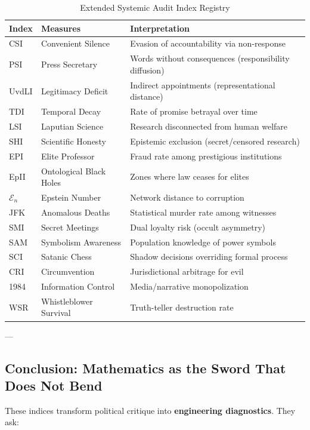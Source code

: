 \documentclass[11pt,a4paper]{article}
\theoremstyle{definition}
\theoremstyle{remark}
\begin{document}
\begin{table}[h]
\centering
\small
\begin{tabular}{|l|l|p{6cm}|}
\hline
\textbf{Index} & \textbf{Measures} & \textbf{Interpretation} \\
\hline
CSI & Convenient Silence & Evasion of accountability via non-response \\
PSI & Press Secretary & Words without consequences (responsibility diffusion) \\
UvdLI & Legitimacy Deficit & Indirect appointments (representational distance) \\
TDI & Temporal Decay & Rate of promise betrayal over time \\
\hline
LSI & Laputian Science & Research disconnected from human welfare \\
SHI & Scientific Honesty & Epistemic exclusion (secret/censored research) \\
EPI & Elite Professor & Fraud rate among prestigious institutions \\
\hline
EpII & Ontological Black Holes & Zones where law ceases for elites \\
$\mathcal{E}_n$ & Epstein Number & Network distance to corruption \\
JFK & Anomalous Deaths & Statistical murder rate among witnesses \\
SMI & Secret Meetings & Dual loyalty risk (occult asymmetry) \\
SAM & Symbolism Awareness & Population knowledge of power symbols \\
\hline
SCI & Satanic Chess & Shadow decisions overriding formal process \\
CRI & Circumvention & Jurisdictional arbitrage for evil \\
1984 & Information Control & Media/narrative monopolization \\
WSR & Whistleblower Survival & Truth-teller destruction rate \\
\hline
\end{tabular}
\caption{Extended Systemic Audit Index Registry}
\label{tab:index_registry}
\end{table}

---

\subsection{Conclusion: Mathematics as the Sword That Does Not Bend}

These indices transform political critique into \textbf{engineering diagnostics}. They ask:
\end{document}
